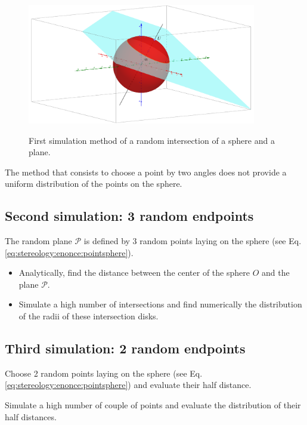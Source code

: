 \begin{figure}[htbp]
 \centering\caption{First simulation method of a random intersection  of a sphere and a plane.}%
 \includegraphics[width=10cm]{section_sphere.png}%
 \label{fig:stereology:enonce:sphere}%
\end{figure}

\begin{rmq}The method that consists to choose a point by two angles does not provide a uniform distribution of the points on the sphere.
\end{rmq}


\subsection{Second simulation: 3 random endpoints}
The random plane $\mathcal{P}$ is defined by 3 random points laying on the sphere (see Eq. \ref{eq:stereology:enonce:pointsphere}). 

\begin{qbox}
\begin{itemize}
 \item Analytically, find the distance between the center of the sphere $O$ and the plane $\mathcal{P}$.
 \item Simulate a high number of intersections and find numerically the distribution of the radii of these intersection disks.
\end{itemize}

\end{qbox}

\subsection{Third simulation: 2 random endpoints}
Choose 2 random points laying on the sphere (see Eq. \ref{eq:stereology:enonce:pointsphere}) and evaluate their half distance.

\begin{qbox}
Simulate a high number of couple of points and evaluate the distribution of their half distances.
\end{qbox}

